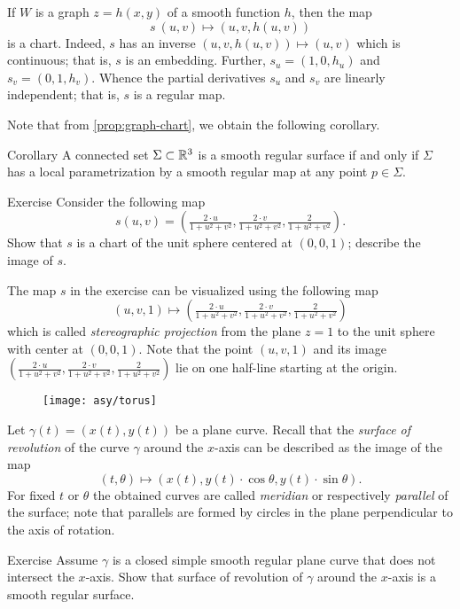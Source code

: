If $W$ is a graph $z=h(x,y)$ of a smooth function $h$, then the map 
\[s\:(u,v)\mapsto (u,v,h(u,v))\] is a chart.
Indeed, $s$ has an inverse $(u,v,h(u,v))\mapsto (u,v)$ which is continuous;
that is, $s$ is an embedding.
Further,
$s_u=(1,0,h_u)$ and $s_v=(0,1,h_v)$. 
Whence the partial derivatives $s_u$ and $s_v$ are linearly independent;
that is, $s$ is a regular map.

Note that from \ref{prop:graph-chart}, we obtain the following corollary.

\begin{thm}{Corollary}\label{cor:reg-parmeterization}
A connected set $\Sigma\subset \mathbb{R}^3$ is a smooth regular surface if and only if $\Sigma$ has a local parametrization by a smooth regular map at any point $p\in\Sigma$.
\end{thm}


\begin{thm}{Exercise}\label{ex:inversion-chart}
Consider the following map 
\[s(u,v)=(\tfrac{2\cdot u}{1+u^2+v^2},\tfrac{2\cdot v}{1+u^2+v^2},\tfrac{2}{1+u^2+v^2}).\]
Show that $s$ is a chart of the unit sphere centered at $(0,0,1)$; describe the image of $s$.
\end{thm}

The map $s$ in the exercise can be visualized using the following map
\[(u,v,1)\mapsto (\tfrac{2\cdot u}{1+u^2+v^2},\tfrac{2\cdot v}{1+u^2+v^2},\tfrac{2}{1+u^2+v^2})\]
which is called \emph{stereographic projection} from the plane $z=1$ to the unit sphere with center at $(0,0,1)$.
Note that the point $(u,v,1)$ and its image $(\tfrac{2\cdot u}{1+u^2+v^2},\tfrac{2\cdot v}{1+u^2+v^2},\tfrac{2}{1+u^2+v^2})$ lie on one half-line starting at the origin. %

\begin{wrapfigure}{o}{31 mm}
\vskip-0mm
\centering
\texttt{[image: asy/torus]}
\vskip-0mm
\end{wrapfigure}

Let $\gamma(t)=(x(t),y(t))$ be a plane curve.
Recall that the \emph{surface of revolution} of the curve $\gamma$ around the $x$-axis can be described as the 
image of the map 
\[(t,\theta)\mapsto (x(t), y(t)\cdot\cos\theta,y(t)\cdot\sin\theta).\]
For fixed $t$ or $\theta$ the obtained curves are called \emph{meridian} or respectively \emph{parallel} of the surface; note that parallels are formed by circles in the plane perpendicular to the axis of rotation.

\begin{thm}{Exercise}\label{ex:revolution}
Assume $\gamma$ is a closed simple smooth regular plane curve that does not intersect the $x$-axis.
Show that surface of revolution of $\gamma$ around the $x$-axis is a smooth regular surface.
\end{thm}



